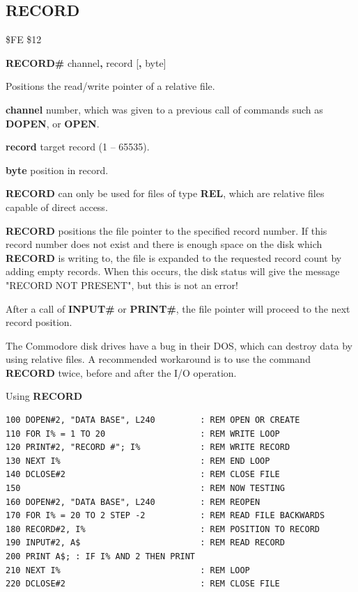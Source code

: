 
\newpage
\subsection{RECORD}
\begin{description}[leftmargin=2cm,style=nextline]
\item [Token:]    \$FE \$12

\item [Format:]   {\bf RECORD\#} channel{\bf,} record [{\bf,} byte]

\item [Usage:]    Positions the read/write pointer of a relative file.

                  {\bf channel} number, which was given to a previous call of commands such as {\bf DOPEN}, or {\bf OPEN}.

                  {\bf record} target record (1 -- 65535).

                  {\bf byte} position in record.

                  {\bf RECORD} can only be used for files of type {\bf REL}, which are relative files capable of direct access.

                  {\bf RECORD} positions the file pointer to the specified record number. If this record number does not exist and there is enough space on the disk which {\bf RECORD} is writing to, the file is expanded to the requested record count by adding empty records. When this occurs, the disk status will give the message "RECORD NOT PRESENT", but this is not an error!

                  After a call of {\bf INPUT\#} or {\bf PRINT\#}, the file pointer will proceed to the next record position.

\item [Remarks:]  The Commodore disk drives have a bug in their DOS, which can destroy data by using relative files. A recommended workaround is to use the command {\bf RECORD} twice, before and after the I/O operation.

\item [Example:] Using {\bf RECORD}

\begin{tcolorbox}[colback=black,coltext=white]
\verbatimfont{\codefont}
\begin{verbatim}
100 DOPEN#2, "DATA BASE", L240         : REM OPEN OR CREATE
110 FOR I% = 1 TO 20                   : REM WRITE LOOP
120 PRINT#2, "RECORD #"; I%            : REM WRITE RECORD
130 NEXT I%                            : REM END LOOP
140 DCLOSE#2                           : REM CLOSE FILE
150                                    : REM NOW TESTING
160 DOPEN#2, "DATA BASE", L240         : REM REOPEN
170 FOR I% = 20 TO 2 STEP -2           : REM READ FILE BACKWARDS
180 RECORD#2, I%                       : REM POSITION TO RECORD
190 INPUT#2, A$                        : REM READ RECORD
200 PRINT A$; : IF I% AND 2 THEN PRINT
210 NEXT I%                            : REM LOOP
220 DCLOSE#2                           : REM CLOSE FILE


\end{verbatim}
\end{tcolorbox}
\end{description}
